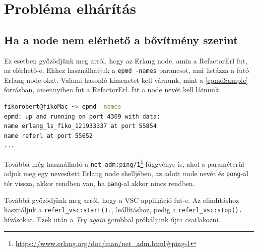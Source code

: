 \section{Probléma elhárítás}
\subsection{Ha a node nem elérhető a bővítmény szerint} \label{not_reachable_node}

Ez esetben győződjünk meg arról, hogy az Erlang node, amin a RefactorErl fut, az elérhető-e. Ehhez használhatjuk a \lstinline{epmd -names} parancsot, ami listázza a futó Erlang node-okat.
Valami hasonló kimenetet kell várnunk, mint a \ref{epmdSample} forrásban, amennyiben fut a RefactorErl. Itt a node nevét kell látnunk.

\lstset{caption=Erlang Port Mapper Deamon (epmd) példa kimenete, label=src:sh}  \label{epmdSample}
\begin{lstlisting}[language={sh}] 
fikorobert@fikoMac ~> epmd -names
epmd: up and running on port 4369 with data:
name erlang_ls_fiko_121933337 at port 55854
name referl at port 55652
...
\end{lstlisting}


Továbbá még használható a \lstinline{net_adm:ping/1}\footnote{\url{https://www.erlang.org/doc/man/net_adm.html#ping-1}} függvénye is, ahol a paraméterül adjuk meg egy nevesített Erlang node shelljében, az adott node nevét és \lstinline{pong}-al tér vissza, akkor rendben van, ha \lstinline{pang}-al akkor nincs rendben.

Továbbá győződjünk meg arról, hogy a VSC applikáció fut-e. Az elindításhoz használjuk a \lstinline{referl_vsc:start().}, leállításhoz, pedig a \lstinline{referl_vsc:stop().} hívásokat. Ezek után a \textit{Try again} gombbal próbáljunk újra csatlakozni.
